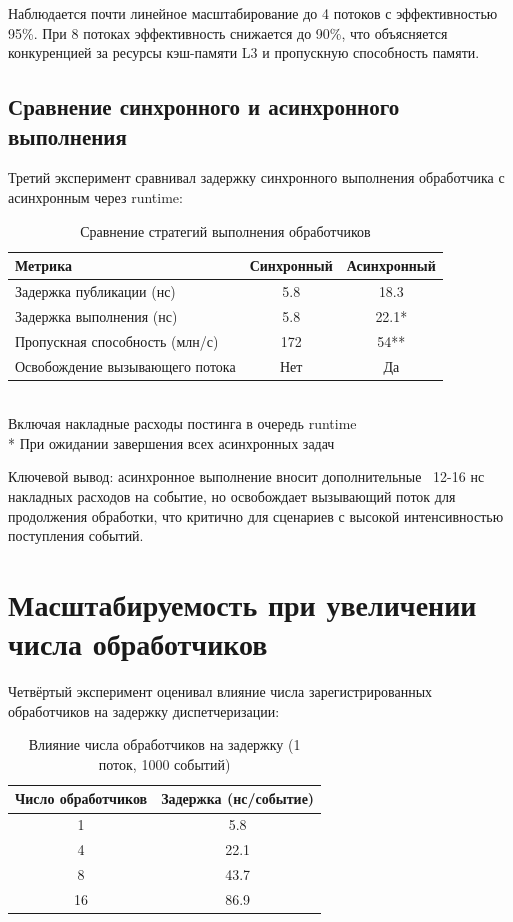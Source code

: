 \documentclass[12pt,a4paper]{report}
\begin{document}
Наблюдается почти линейное масштабирование до 4 потоков с эффективностью 95\%. При 8 потоках эффективность снижается до 90\%, что объясняется конкуренцией за ресурсы кэш-памяти L3 и пропускную способность памяти.

\subsection{Сравнение синхронного и асинхронного выполнения}
Третий эксперимент сравнивал задержку синхронного выполнения обработчика с асинхронным через runtime:

\begin{table}[H]
\centering
\caption{Сравнение стратегий выполнения обработчиков}
\label{tab:sync_vs_async}
\begin{tabular}{lcc}
\toprule
\textbf{Метрика} & \textbf{Синхронный} & \textbf{Асинхронный} \\
\midrule
Задержка публикации (нс) & 5.8 & 18.3 \\
Задержка выполнения (нс) & 5.8 & 22.1* \\
Пропускная способность (млн/с) & 172 & 54** \\
Освобождение вызывающего потока & Нет & Да \\
\bottomrule
\end{tabular}
\smallskip\\
\footnotesize * Включая накладные расходы постинга в очередь runtime\\
\footnotesize ** При ожидании завершения всех асинхронных задач
\end{table}

Ключевой вывод: асинхронное выполнение вносит дополнительные ~12-16 нс накладных расходов на событие, но освобождает вызывающий поток для продолжения обработки, что критично для сценариев с высокой интенсивностью поступления событий.

\section{Масштабируемость при увеличении числа обработчиков}
Четвёртый эксперимент оценивал влияние числа зарегистрированных обработчиков на задержку диспетчеризации:

\begin{table}[H]
\centering
\caption{Влияние числа обработчиков на задержку (1 поток, 1000 событий)}
\label{tab:handler_scaling}
\begin{tabular}{cc}
\toprule
\textbf{Число обработчиков} & \textbf{Задержка (нс/событие)} \\
\midrule
1 & 5.8 \\
4 & 22.1 \\
8 & 43.7 \\
16 & 86.9 \\
\bottomrule
\end{tabular}
\end{table}
\end{document}
